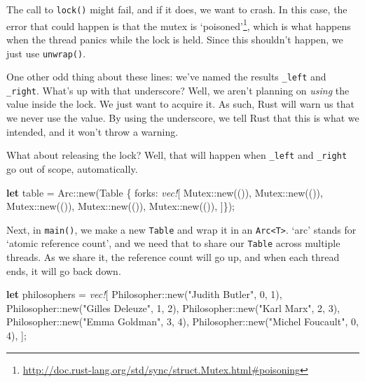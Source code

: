 \documentclass[a4paper,]{book}
\newenvironment{Shaded}{\begin{snugshade}}{\end{snugshade}}
\newcommand{\KeywordTok}[1]{\textcolor[rgb]{0.13,0.29,0.53}{\textbf{{#1}}}}
\newcommand{\DecValTok}[1]{\textcolor[rgb]{0.00,0.00,0.81}{{#1}}}
\newcommand{\StringTok}[1]{\textcolor[rgb]{0.31,0.60,0.02}{{#1}}}
\newcommand{\PreprocessorTok}[1]{\textcolor[rgb]{0.56,0.35,0.01}{\textit{{#1}}}}
\newcommand{\NormalTok}[1]{{#1}}
\renewcommand{\href}[2]{#2\footnote{\url{#1}}}
\begin{document}
The call to \texttt{lock()} might fail, and if it does, we want to
crash. In this case, the error that could happen is that the mutex is
\href{http://doc.rust-lang.org/std/sync/struct.Mutex.html\#poisoning}{`poisoned'},
which is what happens when the thread panics while the lock is held.
Since this shouldn't happen, we just use \texttt{unwrap()}.

One other odd thing about these lines: we've named the results
\texttt{\_left} and \texttt{\_right}. What's up with that underscore?
Well, we aren't planning on \emph{using} the value inside the lock. We
just want to acquire it. As such, Rust will warn us that we never use
the value. By using the underscore, we tell Rust that this is what we
intended, and it won't throw a warning.

What about releasing the lock? Well, that will happen when
\texttt{\_left} and \texttt{\_right} go out of scope, automatically.

\begin{Shaded}
\begin{Highlighting}[]
    \KeywordTok{let} \NormalTok{table = Arc::new(Table \{ forks: }\PreprocessorTok{vec!}\NormalTok{[}
        \NormalTok{Mutex::new(()),}
        \NormalTok{Mutex::new(()),}
        \NormalTok{Mutex::new(()),}
        \NormalTok{Mutex::new(()),}
        \NormalTok{Mutex::new(()),}
    \NormalTok{]\});}
\end{Highlighting}
\end{Shaded}

Next, in \texttt{main()}, we make a new \texttt{Table} and wrap it in an
\texttt{Arc\textless{}T\textgreater{}}. `arc' stands for `atomic
reference count', and we need that to share our \texttt{Table} across
multiple threads. As we share it, the reference count will go up, and
when each thread ends, it will go back down.

\begin{Shaded}
\begin{Highlighting}[]
\KeywordTok{let} \NormalTok{philosophers = }\PreprocessorTok{vec!}\NormalTok{[}
    \NormalTok{Philosopher::new(}\StringTok{"Judith Butler"}\NormalTok{, }\DecValTok{0}\NormalTok{, }\DecValTok{1}\NormalTok{),}
    \NormalTok{Philosopher::new(}\StringTok{"Gilles Deleuze"}\NormalTok{, }\DecValTok{1}\NormalTok{, }\DecValTok{2}\NormalTok{),}
    \NormalTok{Philosopher::new(}\StringTok{"Karl Marx"}\NormalTok{, }\DecValTok{2}\NormalTok{, }\DecValTok{3}\NormalTok{),}
    \NormalTok{Philosopher::new(}\StringTok{"Emma Goldman"}\NormalTok{, }\DecValTok{3}\NormalTok{, }\DecValTok{4}\NormalTok{),}
    \NormalTok{Philosopher::new(}\StringTok{"Michel Foucault"}\NormalTok{, }\DecValTok{0}\NormalTok{, }\DecValTok{4}\NormalTok{),}
\NormalTok{];}
\end{Highlighting}
\end{Shaded}
\end{document}
